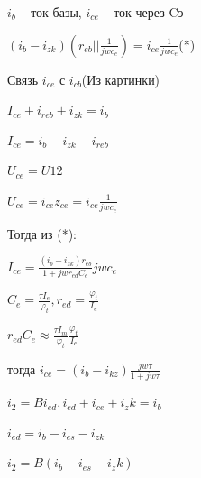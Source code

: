\documentclass[12pt,a4paper]{article}
\begin{document}
$i_b$ – ток базы, $i_{ce}$ – ток через Cэ

$(i_b - i_{zk})(r_{eb}||\frac{1}{jwc_e})= i_{ce}\frac{1}{jwc_e}$(*)
\begin{center}
\begin{figure}[h!]
		\label{}
	\end{figure}
\end{center}
Связь $i_{ce}$ с $i_{cb}$(Из картинки)

$I_{ce}+i_{reb} + i_{zk}=i_b$

$I_{ce}= i_b -  i_{zk} - i_{reb}$

$U_{ce} = U12$

$U_{ce}=i_{ce}z_{ce}= i_{ce}\frac{1}{jwc_e}$

Тогда из (*):

$I_{ce} = \frac{(i_b - i_{zk})r_{eb}}{1+jwr_{ed} C_e}jwc_e$

$C_e=\frac{\tau I_e}{\varphi_t}, r_{ed}=\frac{\varphi_t }{ I_e }$

$r_{ed} C_e \approx\frac{\tau I_m}{\varphi_t }\frac{\varphi_t }{ I_e }$

тогда $i_{ce}=(i_b - i_{kz}) \frac{jw\tau}{1+ jw\tau}$

$i_2=Bi_{ed}, i_{ed}+i_{ce}+i_zk=i_b$

$i_{ed}= i_b-i_{es}-i_{zk}$

$i_2=B(i_b-i_{es}-i_zk)$
\end{document}

